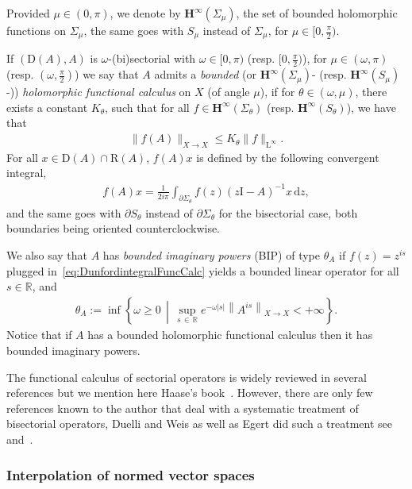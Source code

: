 \documentclass[10pt]{amsart}
\theoremstyle{definition}\newtheorem{defi}[theo]{Definition}\newtheorem{rema}[theo]{Remark}\newtheorem{exam}[theo]{Example}\newtheorem{exem}[theo]{Example}\newtheorem{nota}[theo]{Notation}
\newcommand{\bbR}{\mathbb{R}}
\newcommand{\rmd}{\mathrm{d}}
\newcommand{\rmD}{\mathrm{D}}
\newcommand{\rmL}{\mathrm{L}}
\newcommand{\rmR}{\mathrm{R}}
\newcommand{\rmI}{\mathrm{I}}
\newcommand{\bfH}{\mathbf{H}}
\begin{document}
Provided $\mu\in(0,\pi)$, we denote by $\bfH^\infty(\Sigma_\mu)$, the set of bounded holomorphic functions on $\Sigma_\mu$, the same goes with $S_\mu$ instead of $\Sigma_\mu$, for $\mu\in[0,\frac{\pi}{2})$.

If $(\rmD(A),A)$ is $\omega$-(bi)sectorial with $\omega\in[0,\pi)$ (resp. $[0,\frac{\pi}{2})$), for $\mu\in(\omega,\pi)$ (resp. $(\omega,\frac{\pi}{2})$) we say that $A$ admits a \emph{bounded} (or $\bfH^\infty(\Sigma_\mu)$- (resp. $\bfH^\infty(S_\mu)$-)) \emph{holomorphic functional calculus} on $X$ (of angle $\mu$), if for $\theta\in (\omega,\mu)$, there exists a constant $K_\theta$, such that for all $f\in\bfH^\infty(\Sigma_\theta)$ (resp. $\bfH^\infty(S_\theta)$), we have that
\begin{align*}
\| f(A)\|_{X\rightarrow X}\leqslant K_\theta \| f \|_{\rmL^\infty}.
\end{align*}
For all $x\in \rmD(A)\cap\rmR (A)$, $f(A)x$ is defined by the following convergent integral,
\begin{align}\label{eq:DunfordintegralFuncCalc}
f(A)x = \frac{1}{2 i \pi}\int_{\partial \Sigma_\theta} f(z)(z\rmI -A)^{-1}x\,\rmd z,
\end{align}
and the same goes with $\partial S_\theta$ instead of $\partial \Sigma_\theta$ for the bisectorial case, both boundaries being oriented counterclockwise.

We also say that $A$ has {\emph{bounded imaginary powers}} (BIP) of type $\theta_A$ if $f(z)=z^{is}$ plugged in~\eqref{eq:DunfordintegralFuncCalc} yields a bounded linear operator for all $s\in\bbR$, and
\begin{align*}
\theta_A:= \inf \left\{ \omega\geqslant 0\,\middle|\, \sup_{s\,\in\,\bbR} e^{-\omega|s|}\left\| A^{is}\right\|_{X \rightarrow X}<+\infty\right\}.
\end{align*}
Notice that if $A$ has a bounded holomorphic functional calculus then it has bounded imaginary powers.


The functional calculus of sectorial operators is widely reviewed in several references but we mention here Haase's book~\cite{bookHaase2006}. However, there are only few references known to the author that deal with a systematic treatment of bisectorial operators, Duelli and Weis as well as Egert did such a treatment see~\cite{DuelliWeis2004} and~\cite[Chapter~3]{EgertPhDThesis2015}.


\subsubsection{Interpolation of normed vector spaces}
\end{document}
